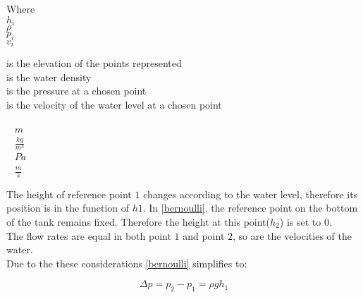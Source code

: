 \begin{minipage}[t]{0.20\textwidth}
Where\\
\hspace*{8mm} $h_i$ \\
\hspace*{8mm} $\rho$ \\
\hspace*{8mm} $p_i$ \\
\hspace*{8mm} $v_i$ \\

\end{minipage}
\begin{minipage}[t]{0.68\textwidth}
\vspace*{2mm}
is the elevation of the points represented\\
is the water density\\
is the pressure at a chosen point\\
is the velocity of the water level at a chosen point
\end{minipage}
\begin{minipage}[t]{0.10\textwidth}
\vspace*{2mm}
\textcolor{White}{te}$\unit{m}$\\
\textcolor{White}{te}$\unit{\frac{kg}{m^3}}$\\
\textcolor{White}{te}$\unit{Pa}$\\
\textcolor{White}{te}$\unit{\frac{m}{s}}$
\end{minipage}


The height of reference point $1$ changes according to the water level, therefore its position is in the function of $h1$. 
In \eqref{bernoulli}, the reference point on the bottom of the tank remains fixed.
Therefore the height at this point($h_2$) is set to 0. 
\\

The flow rates are equal in both point $1$ 
and point $2$, so are the velocities of the water. \\
Due to the these considerations \eqref{bernoulli} simplifies to: 

\begin{equation}
  \Delta p = p_2 - p_1 = \rho g h_1
  \label{Pressuredifference}
\end{equation}

